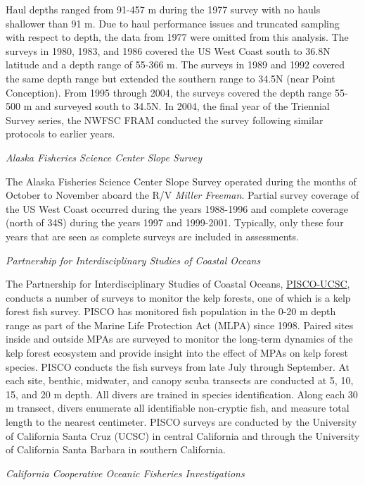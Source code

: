 \documentclass[
  english,
  a4paper,
]{article}
\begin{document}
Haul depths ranged from 91-457 m during the 1977 survey with no hauls shallower
than 91 m.
Due to haul performance issues and truncated sampling with respect to depth, the
data from 1977 were omitted from this analysis.
The surveys in 1980, 1983, and 1986 covered the US West Coast south to
36.8\textdegree N latitude and a depth range of 55-366 m.
The surveys in 1989 and 1992 covered the same depth range but extended the
southern range to 34.5\textdegree N (near Point Conception).
From 1995 through 2004, the surveys covered the depth range 55-500 m and
surveyed south to 34.5\textdegree N.
In 2004, the final year of the Triennial Survey series, the NWFSC FRAM
conducted the survey following similar protocols to earlier years.

\emph{Alaska Fisheries Science Center Slope Survey}

The Alaska Fisheries Science Center Slope Survey operated during the months of October to November aboard the
R/V \emph{Miller Freeman}.
Partial survey coverage of the US West Coast occurred during the years 1988-1996
and complete coverage (north of 34\textquotesingle S) during the
years 1997 and 1999-2001.
Typically, only these four years that are seen as complete surveys are included
in assessments.

\emph{Partnership for Interdisciplinary Studies of Coastal Oceans}

The Partnership for Interdisciplinary Studies of Coastal Oceans,
\href{http://www.piscoweb.org/kelp-forest-study}{PISCO-UCSC}, conducts a number of surveys
to monitor the kelp forests, one of which is a kelp forest fish survey. PISCO
has monitored fish population in the 0-20 m depth range as part of the
Marine Life Protection Act (MLPA) since 1998. Paired sites inside and outside MPAs
are surveyed to monitor the long-term dynamics of the kelp forest ecosystem and provide
insight into the effect of MPAs on kelp forest species. PISCO conducts the fish
surveys from late July through September. At each site, benthic, midwater, and canopy
scuba transects are conducted at 5, 10, 15, and 20 m depth. All divers are trained
in species identification. Along each 30 m transect, divers enumerate all identifiable
non-cryptic fish, and measure total length to the nearest centimeter. PISCO surveys
are conducted by the University of California Santa Cruz (UCSC) in central California and
through the University of California Santa Barbara in southern California.

\emph{California Cooperative Oceanic Fisheries Investigations}
\end{document}
